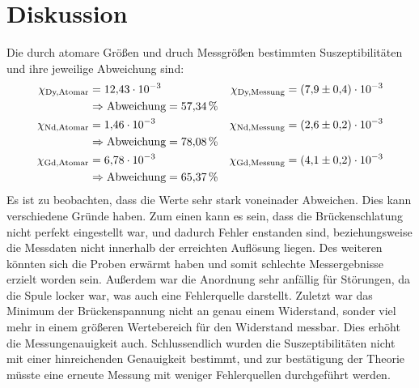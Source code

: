 \section{Diskussion}
\label{sec:Diskussion}
Die durch atomare Größen und druch Messgrößen bestimmten Suszeptibilitäten und ihre jeweilige Abweichung sind:
\begin{align*}
  \chi_\text{Dy,Atomar} &= \num{12.43e-3} & \chi_\text{Dy,Messung} &= \num{7.9\pm0.4e-3} \\
    & \Rightarrow \text{Abweichung} = \SI{57.34}{\percent} \\
  \chi_\text{Nd,Atomar} &= \num{1.46e-3} & \chi_\text{Nd,Messung} &= \num{2.6\pm0.2e-3} \\
    & \Rightarrow \text{Abweichung} = \SI{78.08}{\percent} \\
  \chi_\text{Gd,Atomar} &= \num{6.78e-3} & \chi_\text{Gd,Messung} &= \num{4.1\pm0.2e-3} \\
    & \Rightarrow \text{Abweichung} = \SI{65.37}{\percent}
\end{align*}
Es ist zu beobachten, dass die Werte sehr stark voneinader Abweichen. Dies kann verschiedene Gründe haben.
Zum einen kann es sein, dass die Brückenschlatung nicht perfekt eingestellt war, und dadurch Fehler enstanden sind, beziehungsweise
die Messdaten nicht innerhalb der erreichten Auflösung liegen. Des weiteren könnten sich die Proben erwärmt haben und somit schlechte
Messergebnisse erzielt worden sein. Außerdem war die Anordnung sehr anfällig für Störungen, da die Spule locker war, was auch eine
Fehlerquelle darstellt. Zuletzt war das Minimum der Brückenspannung nicht an genau einem Widerstand, sonder viel mehr in einem größeren
Wertebereich für den Widerstand messbar. Dies erhöht die Messungenauigkeit auch. Schlussendlich wurden die Suszeptibilitäten nicht
mit einer hinreichenden Genauigkeit bestimmt, und zur bestätigung der Theorie müsste eine erneute Messung mit weniger Fehlerquellen
durchgeführt werden.
